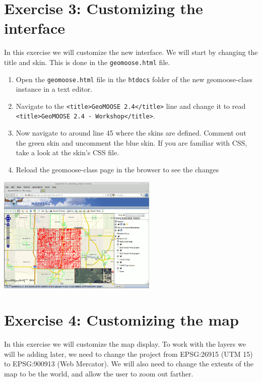 \documentclass[letterpaper]{article}
\begin{document}
\section*{Exercise 3: Customizing the interface}
In this exercise we will customize the new interface.  We will start
by changing the title and skin.  This is done in the
\texttt{geomoose.html} file.

\begin{enumerate}
\item Open the \texttt{geomoose.html} file in the \texttt{htdocs}
  folder of the new geomoose-class instance in a text editor.
\item Navigate to the \verb|<title>GeoMOOSE 2.4</title>| line and
  change it to read \\ \verb|<title>GeoMOOSE 2.4 - Workshop</title>|.
\item Now navigate to around line 45 where the skins are defined.
  Comment out the green skin and uncomment the blue skin.  If you are
  familiar with CSS, take a look at the skin's CSS file.
\item Reload the geomoose-class page in the browser to see the changes
\end{enumerate}

\begin{center}
  \includegraphics[width=3in]{images/03-results.png}
\end{center}

\section*{Exercise 4: Customizing the map}
In this exercise we will customize the map display.  To work with the
layers we will be adding later, we need to change the project from
EPSG:26915 (UTM 15) to EPSG:900913 (Web Mercator).  We will also need
to change the extents of the map to be the world, and allow the user
to zoom out farther.
\end{document}
